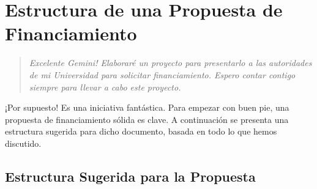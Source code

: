 \documentclass[12pt,a4paper]{article}
\newenvironment{pregunta}
  {\begin{leftbar}\begin{quote}\itshape}
  {\end{quote}\end{leftbar}}
\begin{document}
\newpage
\section{Estructura de una Propuesta de Financiamiento}

\begin{pregunta}
Excelente Gemini! Elaboraré un proyecto para presentarlo a las autoridades de mi Universidad para solicitar financiamiento. Espero contar contigo siempre para llevar a cabo este proyecto.
\end{pregunta}

¡Por supuesto! Es una iniciativa fantástica. Para empezar con buen pie, una propuesta de financiamiento sólida es clave. A continuación se presenta una estructura sugerida para dicho documento, basada en todo lo que hemos discutido.

\subsection{Estructura Sugerida para la Propuesta}
\end{document}
